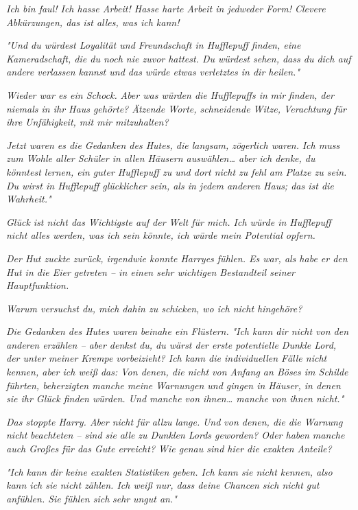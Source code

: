{\emph{Ich bin faul! Ich hasse Arbeit! Hasse harte Arbeit in jedweder Form! Clevere Abkürzungen, das ist alles, was ich kann!}

\emph{"Und du würdest Loyalität und Freundschaft in Hufflepuff finden, eine Kameradschaft, die du noch nie zuvor hattest. Du würdest sehen, dass du dich auf andere verlassen kannst und das würde etwas verletztes in dir heilen."}

\emph{Wieder war es ein Schock.} \emph{\emph{Aber was würden die Hufflepuffs in}} \emph{mir} \emph{\emph{finden, der niemals in ihr Haus gehörte? Ätzende Worte, schneidende Witze, Verachtung für ihre Unfähigkeit, mit mir mitzuhalten?}}

\emph{Jetzt waren es die Gedanken des Hutes, die langsam, zögerlich waren.} \emph{\emph{Ich muss zum Wohle aller Schüler in allen Häusern auswählen… aber ich denke, du könntest lernen, ein guter Hufflepuff zu und dort nicht zu fehl am Platze zu sein. Du wirst in Hufflepuff glücklicher sein, als in jedem anderen Haus; das ist die Wahrheit."}}

\emph{Glück ist nicht das Wichtigste auf der Welt für mich. Ich würde in Hufflepuff nicht alles werden, was ich sein könnte, ich würde mein Potential opfern.}

\emph{Der Hut zuckte zurück, irgendwie konnte Harryes fühlen. Es war, als habe er den Hut in die Eier getreten -- in einen sehr wichtigen Bestandteil seiner Hauptfunktion.}

\emph{\emph{Warum versuchst du, mich dahin zu schicken, wo ich nicht hingehöre?}}

\emph{Die Gedanken des Hutes waren beinahe ein Flüstern.} \emph{\emph{"Ich kann dir nicht von den anderen erzählen -- aber denkst du, du wärst der erste potentielle Dunkle Lord, der unter meiner Krempe vorbeizieht? Ich kann die individuellen Fälle nicht kennen, aber ich weiß das: Von denen, die nicht von Anfang an Böses im Schilde führten, beherzigten manche meine Warnungen und gingen in Häuser, in denen sie ihr Glück finden würden. Und manche von ihnen… manche von ihnen nicht."}}

\emph{Das stoppte Harry. Aber nicht für allzu lange.} \emph{\emph{Und von denen, die die Warnung}} \emph{nicht} \emph{\emph{beachteten -- sind sie}} \emph{alle} \emph{\emph{zu Dunklen Lords geworden? Oder haben manche auch Großes für das Gute erreicht? Wie genau sind hier die exakten Anteile?}}

\emph{"Ich kann dir keine exakten Statistiken geben. Ich kann sie nicht kennen, also kann ich sie nicht zählen. Ich weiß nur, dass deine Chancen sich nicht gut anfühlen. Sie fühlen sich} \emph{sehr} \emph{\emph{ungut an."}}

}

